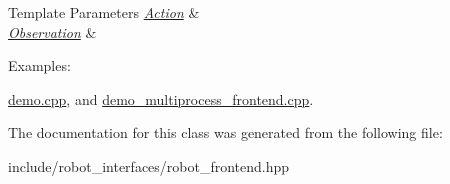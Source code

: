 \begin{DoxyTemplParams}{Template Parameters}
{\em \hyperlink{classAction}{Action}} & \\
\hline
{\em \hyperlink{classObservation}{Observation}} & \\
\hline
\end{DoxyTemplParams}
\begin{Desc}
\item[Examples\+: ]\par
\hyperlink{demo_8cpp-example}{demo.\+cpp}, and \hyperlink{demo_multiprocess_frontend_8cpp-example}{demo\+\_\+multiprocess\+\_\+frontend.\+cpp}.\end{Desc}


The documentation for this class was generated from the following file\+:\begin{DoxyCompactItemize}
\item 
include/robot\+\_\+interfaces/robot\+\_\+frontend.\+hpp\end{DoxyCompactItemize}
